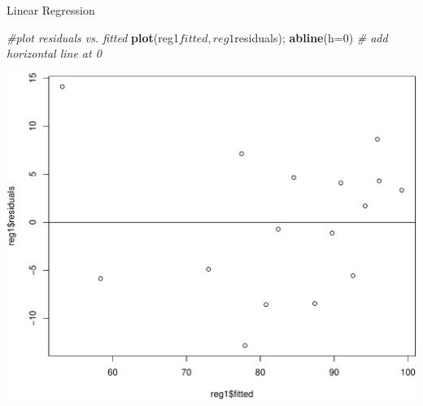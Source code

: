 \documentclass[9pt,ignorenonframetext,]{beamer}
\newenvironment{Shaded}{\begin{snugshade}}{\end{snugshade}}
\newcommand{\KeywordTok}[1]{\textcolor[rgb]{0.13,0.29,0.53}{\textbf{{#1}}}}
\newcommand{\DataTypeTok}[1]{\textcolor[rgb]{0.13,0.29,0.53}{{#1}}}
\newcommand{\DecValTok}[1]{\textcolor[rgb]{0.00,0.00,0.81}{{#1}}}
\newcommand{\CommentTok}[1]{\textcolor[rgb]{0.56,0.35,0.01}{\textit{{#1}}}}
\newcommand{\NormalTok}[1]{{#1}}
\begin{document}
\begin{frame}[fragile]{Linear Regression}

\begin{Shaded}
\begin{Highlighting}[]
\CommentTok{#plot residuals vs. fitted}
\KeywordTok{plot}\NormalTok{(reg1$fitted,reg1$residuals);}
\KeywordTok{abline}\NormalTok{(}\DataTypeTok{h=}\DecValTok{0}\NormalTok{) }\CommentTok{# add horizontal line at 0}
\end{Highlighting}
\end{Shaded}

\includegraphics{class2-jan11_files/figure-beamer/unnamed-chunk-18-1.pdf}

\end{frame}
\end{document}
